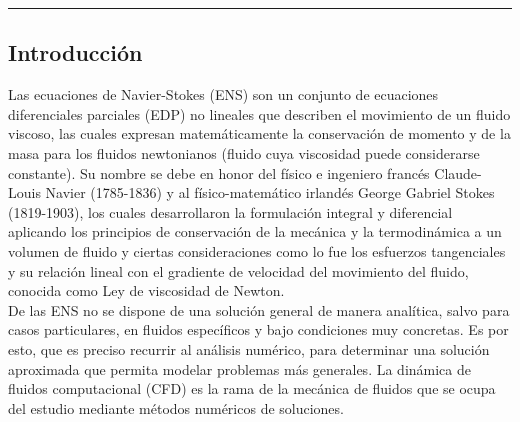 \documentclass[A4,10pt]{article}
\begin{document}
\begin{center}\rule{0.9\textwidth}{0.1mm}
 \end{center}
\begin{multicols}{2}


\section{Introducción}

Las ecuaciones de Navier-Stokes (ENS) son un conjunto de ecuaciones diferenciales parciales (EDP) no lineales que describen el movimiento de un fluido viscoso, las cuales expresan matemáticamente la conservación de momento  y de la masa para los fluidos newtonianos (fluido cuya viscosidad puede considerarse constante)\cite{Achenson}.  Su nombre se debe en honor del físico e ingeniero francés Claude-Louis Navier (1785-1836) y al físico-matemático irlandés George Gabriel Stokes (1819-1903), los cuales desarrollaron la formulación integral y diferencial aplicando los principios de conservación de la mecánica y la termodinámica a un volumen de fluido y ciertas consideraciones como lo fue los esfuerzos tangenciales y su relación lineal con el gradiente de velocidad del movimiento del fluido, conocida como Ley de viscosidad de Newton\cite{Achenson}.\\


De las ENS no se dispone de una solución general de manera analítica, salvo para casos particulares, en fluidos específicos y bajo condiciones muy concretas\cite{Girault,Achenson}. Es por esto, que es preciso recurrir al análisis numérico, para determinar una solución aproximada que permita modelar problemas más generales. La dinámica de fluidos computacional (CFD) es la rama de la mecánica de fluidos que se ocupa del estudio mediante métodos numéricos de soluciones\cite{Barbagroup,Girault}.


\end{multicols}
\end{document}
